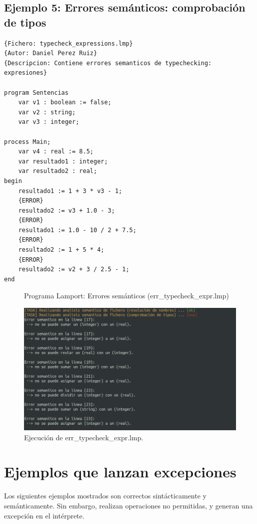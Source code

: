 \newpage
\subsection{Ejemplo 5: Errores semánticos: comprobación de tipos}
\begin{lstlisting}[style=lamportStyle]
{Fichero: typecheck_expressions.lmp}
{Autor: Daniel Perez Ruiz}
{Descripcion: Contiene errores semanticos de typechecking: expresiones}

program Sentencias
	var v1 : boolean := false;
	var v2 : string;
	var v3 : integer;
	
process Main;
	var v4 : real := 8.5;
	var resultado1 : integer;
	var resultado2 : real;
begin
	resultado1 := 1 + 3 * v3 - 1;
	{ERROR}
	resultado2 := v3 + 1.0 - 3;
	{ERROR}
	resultado1 := 1.0 - 10 / 2 + 7.5;
	{ERROR}
	resultado2 := 1 + 5 * 4;
	{ERROR}
	resultado2 := v2 + 3 / 2.5 - 1;
end
\end{lstlisting}
\begin{figure}[h]
\caption{Programa Lamport: Errores semánticos (err\_typecheck\_expr.lmp)}
\label{fig:lamportErrSemanticTypecheck}
\end{figure}

\newpage
\begin{figure}[h]
    \includegraphics[width=\linewidth]{images/ejemplos/err_semantic/typecheck.png}
    \caption{Ejecución de err\_typecheck\_expr.lmp.}
    \label{fig:lamportErrSemanticTypecheck_exec}
\end{figure}

\newpage
\section{Ejemplos que lanzan excepciones}
Los siguientes ejemplos mostrados son correctos sintácticamente y semánticamente. Sin embargo, realizan operaciones no permitidas, y generan una excepción en el intérprete.

